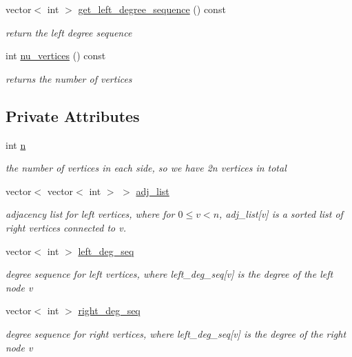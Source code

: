 \begin{DoxyCompactItemize}
vector$<$ int $>$ \hyperlink{classb__graph_afd65fb655f7e24217393a10533b87d3c}{get\+\_\+left\+\_\+degree\+\_\+sequence} () const
\begin{DoxyCompactList}\small\item\em return the left degree sequence \end{DoxyCompactList}\item 
int \hyperlink{classb__graph_a69ff77c254af827afbfe52934b6736a5}{nu\+\_\+vertices} () const
\begin{DoxyCompactList}\small\item\em returns the number of vertices \end{DoxyCompactList}\end{DoxyCompactItemize}
\subsection*{Private Attributes}
\begin{DoxyCompactItemize}
\item 
int \hyperlink{classb__graph_a9e211d40c1799bc9b125de472ff06642}{n}
\begin{DoxyCompactList}\small\item\em the number of vertices in each side, so we have 2n vertices in total \end{DoxyCompactList}\item 
vector$<$ vector$<$ int $>$ $>$ \hyperlink{classb__graph_a2a89d2e8f958270952aab2e8769b7342}{adj\+\_\+list}
\begin{DoxyCompactList}\small\item\em adjacency list for left vertices, where for $0 \leq v < n $, adj\+\_\+list\mbox{[}v\mbox{]} is a sorted list of right vertices connected to v. \end{DoxyCompactList}\item 
vector$<$ int $>$ \hyperlink{classb__graph_a311d16462dbb10c47b3a6c80a42139d9}{left\+\_\+deg\+\_\+seq}
\begin{DoxyCompactList}\small\item\em degree sequence for left vertices, where left\+\_\+deg\+\_\+seq\mbox{[}v\mbox{]} is the degree of the left node v \end{DoxyCompactList}\item 
vector$<$ int $>$ \hyperlink{classb__graph_ae4c875ed6a583a78f38dfe958f20fad5}{right\+\_\+deg\+\_\+seq}
\begin{DoxyCompactList}\small\item\em degree sequence for right vertices, where left\+\_\+deg\+\_\+seq\mbox{[}v\mbox{]} is the degree of the right node v \end{DoxyCompactList}\end{DoxyCompactItemize}
